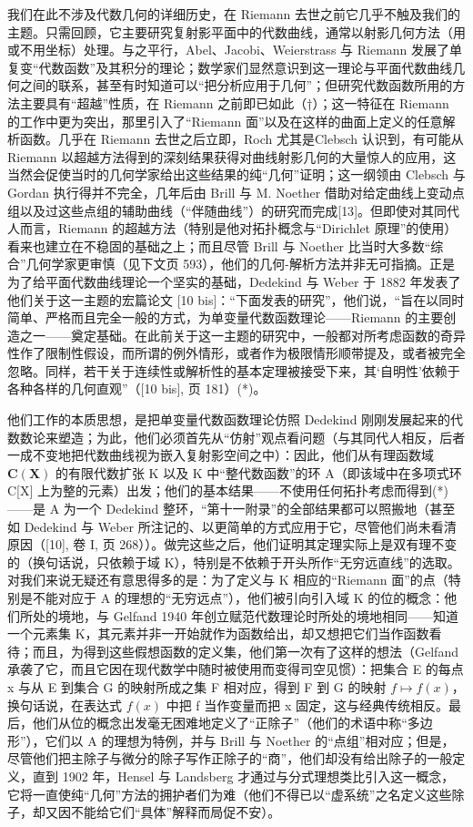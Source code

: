 我们在此不涉及代数几何的详细历史，在 Riemann 去世之前它几乎不触及我们的主题。只需回顾，它主要研究复射影平面中的代数曲线，通常以射影几何方法（用或不用坐标）处理。与之平行，Abel、Jacobi、Weierstrass 与 Riemann 发展了单复变“代数函数”及其积分的理论；数学家们显然意识到这一理论与平面代数曲线几何之间的联系，甚至有时知道可以“把分析应用于几何”；但研究代数函数所用的方法主要具有“超越”性质，在 Riemann 之前即已如此（†）；这一特征在 Riemann 的工作中更为突出，那里引入了“Riemann 面”以及在这样的曲面上定义的任意解析函数。几乎在 Riemann 去世之后立即，Roch 尤其是Clebsch 认识到，有可能从 Riemann 以超越方法得到的深刻结果获得对曲线射影几何的大量惊人的应用，这当然会促使当时的几何学家给出这些结果的纯“几何”证明；这一纲领由 Clebsch 与 Gordan 执行得并不完全，几年后由 Brill 与 M. Noether 借助对给定曲线上变动点组以及过这些点组的辅助曲线（“伴随曲线”）的研究而完成{[}13{]}。但即使对其同代人而言，Riemann 的超越方法（特别是他对拓扑概念与“Dirichlet 原理”的使用）看来也建立在不稳固的基础之上；而且尽管 Brill 与 Noether 比当时大多数“综合”几何学家更审慎（见下文页 593），他们的几何-解析方法并非无可指摘。正是为了给平面代数曲线理论一个坚实的基础，Dedekind 与 Weber 于 1882 年发表了他们关于这一主题的宏篇论文 {[}10 bis{]}：“下面发表的研究”，他们说，“旨在以同时简单、严格而且完全一般的方式，为单变量代数函数理论——Riemann 的主要创造之一——奠定基础。在此前关于这一主题的研究中，一般都对所考虑函数的奇异性作了限制性假设，而所谓的例外情形，或者作为极限情形顺带提及，或者被完全忽略。同样，若干关于连续性或解析性的基本定理被接受下来，其‘自明性’依赖于各种各样的几何直观”（{[}10 bis{]}, 页 181）(*)。

他们工作的本质思想，是把单变量代数函数理论仿照 Dedekind 刚刚发展起来的代数数论来塑造；为此，他们必须首先从“仿射”观点看问题（与其同代人相反，后者一成不变地把代数曲线视为嵌入复射影空间之中）：因此，他们从有理函数域 \(\mathbf{C}(\mathbf{X})\) 的有限代数扩张 K 以及 K 中“整代数函数”的环 A（即该域中在多项式环 C{[}X{]} 上为整的元素）出发；他们的基本结果——不使用任何拓扑考虑而得到(*)——是 A 为一个 Dedekind 整环，“第十一附录”的全部结果都可以照搬地（甚至如 Dedekind 与 Weber 所注记的、以更简单的方式应用于它，尽管他们尚未看清原因（{[}10{]}, 卷 I, 页 268））。做完这些之后，他们证明其定理实际上是双有理不变的（换句话说，只依赖于域 K），特别是不依赖于开头所作“无穷远直线”的选取。对我们来说无疑还有意思得多的是：为了定义与 K 相应的“Riemann 面”的点（特别是不能对应于 A 的理想的“无穷远点”），他们被引向引入域 K 的位的概念：他们所处的境地，与 Gelfand 1940 年创立赋范代数理论时所处的境地相同——知道一个元素集 K，其元素并非一开始就作为函数给出，却又想把它们当作函数看待；而且，为得到这些假想函数的定义集，他们第一次有了这样的想法（Gelfand 承袭了它，而且它因在现代数学中随时被使用而变得司空见惯）：把集合 E 的每点 x 与从 E 到集合 G 的映射所成之集 F 相对应，得到 F 到 G 的映射 \(f \mapsto f(x)\)，换句话说，在表达式 \(f(x)\) 中把 f 当作变量而把 x 固定，这与经典传统相反。最后，他们从位的概念出发毫无困难地定义了“正除子”（他们的术语中称“多边形”），它们以 A 的理想为特例，并与 Brill 与 Noether 的“点组”相对应；但是，尽管他们把主除子与微分的除子写作正除子的“商”，他们却没有给出除子的一般定义，直到 1902 年，Hensel 与 Landsberg 才通过与分式理想类比引入这一概念，它将一直使纯“几何”方法的拥护者们为难（他们不得已以“虚系统”之名定义这些除子，却又因不能给它们“具体”解释而局促不安）。

